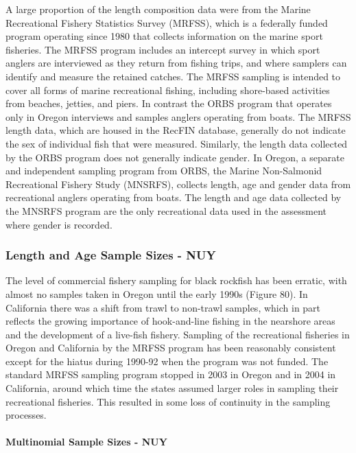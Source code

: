 \documentclass[11pt,
  english,
  letterpaper,
]{article}
\begin{document}
A large proportion of the length composition data were from the Marine Recreational Fishery Statistics Survey (MRFSS), which is a federally funded program operating since 1980 that collects information on the marine sport fisheries. The MRFSS program includes an intercept survey in which sport anglers are interviewed as they return from fishing trips, and where samplers can identify and measure the retained catches. The MRFSS sampling is intended to cover all forms of marine recreational fishing, including shore-based activities from beaches, jetties, and piers. In contrast the ORBS program that operates only in Oregon interviews and samples anglers operating from boats. The MRFSS length data, which are housed in the RecFIN database, generally do not indicate the sex of individual fish that were measured. Similarly, the length data collected by the ORBS program does not generally indicate gender. In Oregon, a separate and independent sampling program from ORBS, the Marine Non-Salmonid Recreational Fishery Study (MNSRFS), collects length, age and gender data from recreational anglers operating from boats. The length and age data collected by the MNSRFS program are the only recreational data used in the assessment where gender is recorded.

\hypertarget{length-and-age-sample-sizes---nuy}{%
\subsubsection{Length and Age Sample Sizes - NUY}\label{length-and-age-sample-sizes---nuy}}

The level of commercial fishery sampling for black rockfish has been erratic, with almost no samples taken in Oregon until the early 1990s (Figure 80). In California there was a shift from trawl to non-trawl samples, which in part reflects the growing importance of hook-and-line fishing in the nearshore areas and the development of a live-fish fishery. Sampling of the recreational fisheries in Oregon and California by the MRFSS program has been reasonably consistent except for the hiatus during 1990-92 when the program was not funded. The standard MRFSS sampling program stopped in 2003 in Oregon and in 2004 in California, around which time the states assumed larger roles in sampling their recreational fisheries. This resulted in some loss of continuity in the sampling processes.

\hypertarget{multinomial-sample-sizes---nuy}{%
\paragraph{Multinomial Sample Sizes - NUY}\label{multinomial-sample-sizes---nuy}}
\end{document}
